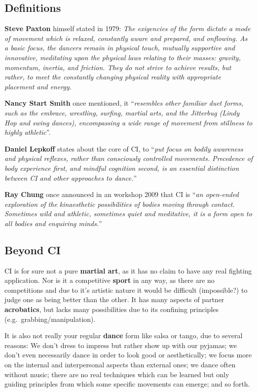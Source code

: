 \subsection{Definitions}\label{subsec:definitions}

\textbf{Steve Paxton} himself stated in 1979: \textit{The exigencies of the form dictate a mode of movement which is relaxed, constantly aware and prepared, and onflowing. As a basic focus, the dancers remain in physical touch, mutually supportive and innovative, meditating upon the physical laws relating to their masses: gravity, momentum, inertia, and friction. They do not strive to achieve results, but rather, to meet the constantly changing physical reality with appropriate placement and energy.}

\textbf{Nancy Start Smith} once mentioned, it ``\textit{resembles other familiar duet forms, such as the embrace, wrestling, surfing, martial arts, and the Jitterbug (Lindy Hop and swing dances), encompassing a wide range of movement from stillness to highly athletic}''.

\textbf{Daniel Lepkoff} states about the core of CI, to ``\textit{put focus on bodily awareness and physical reflexes, rather than consciously controlled movements. Precedence of body experience first, and mindful cognition second, is an essential distinction between CI and other approaches to dance.}''


\textbf{Ray Chung} once announced in an workshop 2009 that CI is ``\textit{an open-ended exploration of the kinaesthetic possibilities of bodies moving through contact. Sometimes wild and athletic, sometimes quiet and meditative, it is a form open to all bodies and enquiring minds.}''

\subsection{Beyond CI}\label{subsec:beyond-ci}

CI is for sure not a pure \textbf{martial art}, as it has no claim to have any real fighting application.
Nor is it a competitive \textbf{sport} in any way, as there are no competitions and due to it's artistic nature it would be difficult (impossible?) to judge one as being better than the other.
It has many aspects of partner \textbf{acrobatics}, but lacks many possibilities due to its confining principles (e.g.\ grabbing/manipulation).

It is also not really your regular \textbf{dance} form like salsa or tango, due to several reasons: We don't dress to impress but rather show up with our pyjamas; we don't even necessarily dance in order to look good or aesthetically; we focus more on the internal and interpersonal aspects than external ones; we dance often without music; there are no real techniques which can be learned but only guiding principles from which some specific movements can emerge; and so forth.


